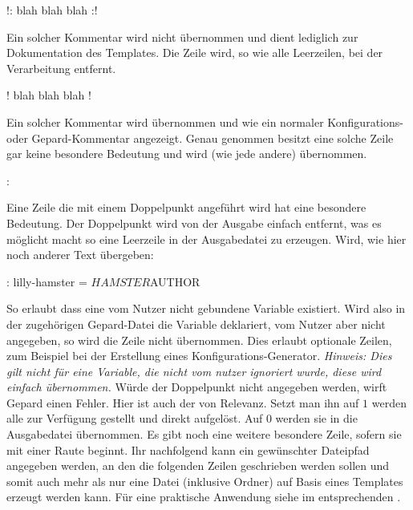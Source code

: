 \begin{gepard*}
!: blah blah blah :!
\end{gepard*}
Ein solcher Kommentar wird nicht übernommen und dient lediglich zur Dokumentation des Templates. Die Zeile wird, so wie alle Leerzeilen, bei der Verarbeitung entfernt.
\begin{gepard*}
! blah blah blah !
\end{gepard*}
Ein solcher Kommentar wird übernommen und wie ein normaler Konfigurations- oder Gepard-Kommentar angezeigt. Genau genommen besitzt eine solche Zeile gar keine besondere Bedeutung und wird (wie jede andere) übernommen.
\begin{gepard*}
:
\end{gepard*}
Eine Zeile die mit einem Doppelpunkt angeführt wird hat eine besondere Bedeutung. Der Doppelpunkt wird von der Ausgabe einfach entfernt, was es möglicht macht so eine Leerzeile in der Ausgabedatei zu erzeugen. Wird, wie hier noch anderer Text übergeben:
\begin{gepard*}
: lilly-hamster =     ${HAMSTER} ${AUTHOR}
\end{gepard*}
So erlaubt \Jake[,] dass eine vom Nutzer nicht gebundene Variable existiert. Wird also in der zugehörigen Gepard-Datei die Variable  deklariert, vom Nutzer aber nicht angegeben, so wird die Zeile nicht übernommen. Dies erlaubt optionale Zeilen, zum Beispiel bei der Erstellung eines Konfigurations-Generator.
\textit{Hinweis: Dies gilt \emph{nicht} für eine Variable, die nicht vom nutzer ignoriert wurde, diese wird einfach übernommen.} Würde der Doppelpunkt nicht angegeben werden, wirft Gepard einen Fehler. Hier ist auch der  von Relevanz. Setzt man ihn auf $1$ werden alle  zur Verfügung gestellt und direkt aufgelöst. Auf $0$ werden sie in die Ausgabedatei übernommen. \newline
Es gibt noch eine weitere besondere Zeile, sofern sie mit einer Raute beginnt. Ihr nachfolgend kann ein gewünschter Dateipfad angegeben werden, an den die folgenden Zeilen geschrieben werden sollen und somit auch mehr als nur eine Datei (inklusive Ordner) auf Basis eines Templates erzeugt werden kann. Für eine praktische Anwendung siehe im entsprechenden .